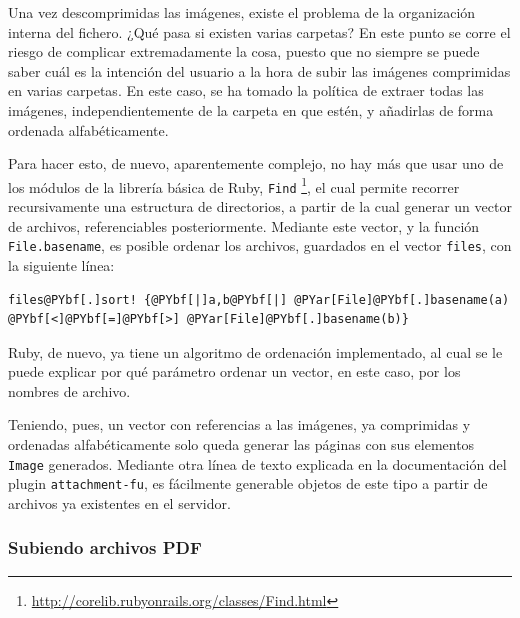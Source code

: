 Una vez descomprimidas las imágenes, existe el problema de la organización interna del fichero. ¿Qué pasa si existen varias carpetas? En este punto se corre el riesgo de complicar extremadamente la cosa, puesto que no siempre se puede saber cuál es la intención del usuario a la hora de subir las imágenes comprimidas en varias carpetas. En este caso, se ha tomado la política de extraer todas las imágenes, independientemente de la carpeta en que estén, y añadirlas de forma ordenada alfabéticamente.

Para hacer esto, de nuevo, aparentemente complejo, no hay más que usar uno de los módulos de la librería básica de Ruby, \texttt{Find} \footnote{\url{http://corelib.rubyonrails.org/classes/Find.html}}, el cual permite recorrer recursivamente una estructura de directorios, a partir de la cual generar un vector de archivos, referenciables posteriormente. Mediante este vector, y la función \texttt{File.basename}, es posible ordenar los archivos, guardados en el vector \texttt{files}, con la siguiente línea:

\begin{Verbatim}[commandchars=@\[\]]
files@PYbf[.]sort! {@PYbf[|]a,b@PYbf[|] @PYar[File]@PYbf[.]basename(a) @PYbf[<]@PYbf[=]@PYbf[>] @PYar[File]@PYbf[.]basename(b)}
\end{Verbatim}


Ruby, de nuevo, ya tiene un algoritmo de ordenación implementado, al cual se le puede explicar por qué parámetro ordenar un vector, en este caso, por los nombres de archivo.

Teniendo, pues, un vector con referencias a las imágenes, ya comprimidas y ordenadas alfabéticamente solo queda generar las páginas con sus elementos \texttt{Image} generados. Mediante otra línea de texto explicada en la documentación del plugin \texttt{attachment-fu}, es fácilmente generable objetos de este tipo a partir de archivos ya existentes en el servidor.


\subsubsection{Subiendo archivos PDF} %
\label{ssub:subiendo_archivos_pdf}

